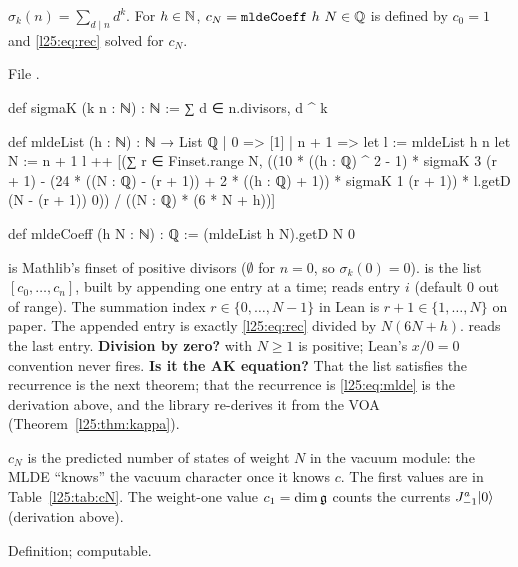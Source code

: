 \begin{definition}\label{l25:def:mlde}
$\sigma_k(n)=\sum_{d\mid n}d^k$. For $h\in{\mathbb{N}}$, $c_N=\mathtt{mldeCoeff}\ h\ N\in{\mathbb{Q}}$ is defined by $c_0=1$
and \eqref{l25:eq:rec} solved for $c_N$.
\end{definition}
\noindent File .
\begin{leancode}
def sigmaK (k n : ℕ) : ℕ := ∑ d ∈ n.divisors, d ^ k

def mldeList (h : ℕ) : ℕ → List ℚ
  | 0 => [1]
  | n + 1 =>
      let l := mldeList h n
      let N := n + 1
      l ++ [(∑ r ∈ Finset.range N,
          ((10 * ((h : ℚ) ^ 2 - 1) * sigmaK 3 (r + 1) -
            (24 * ((N : ℚ) - (r + 1)) + 2 * ((h : ℚ) + 1)) * sigmaK 1 (r + 1)) *
              l.getD (N - (r + 1)) 0)) / ((N : ℚ) * (6 * N + h))]

def mldeCoeff (h N : ℕ) : ℚ := (mldeList h N).getD N 0
\end{leancode}
\begin{dictionary}
 is Mathlib's finset of positive divisors ($\emptyset$ for $n=0$, so $\sigma_k(0)=0$).
 is the list $[c_0,\dots,c_n]$, built by appending one entry at a time;
 reads entry $i$ (default $0$ out of range). The summation index $r\in\{0,\dots,N-1\}$ in Lean is
$r+1\in\{1,\dots,N\}$ on paper. The appended entry is exactly \eqref{l25:eq:rec} divided by $N(6N+h)$.
 reads the last entry. \textbf{Division by zero?}  with
$N\ge1$ is positive; Lean's $x/0=0$ convention never fires. \textbf{Is it the AK equation?} That the list
satisfies the recurrence is the next theorem; that the recurrence is \eqref{l25:eq:mlde} is the derivation above,
and the library re-derives it from the VOA (Theorem~\ref{l25:thm:kappa}).
\end{dictionary}
\begin{physics}
$c_N$ is the predicted number of states of weight $N$ in the vacuum module: the MLDE ``knows'' the vacuum character
once it knows $c$. The first values are in Table~\ref{l25:tab:cN}. The weight-one value $c_1=\dim\mathfrak g$ counts
the currents $J^a_{-1}|0\rangle$ (derivation above).
\end{physics}
\begin{status}
Definition; computable.
\end{status}

